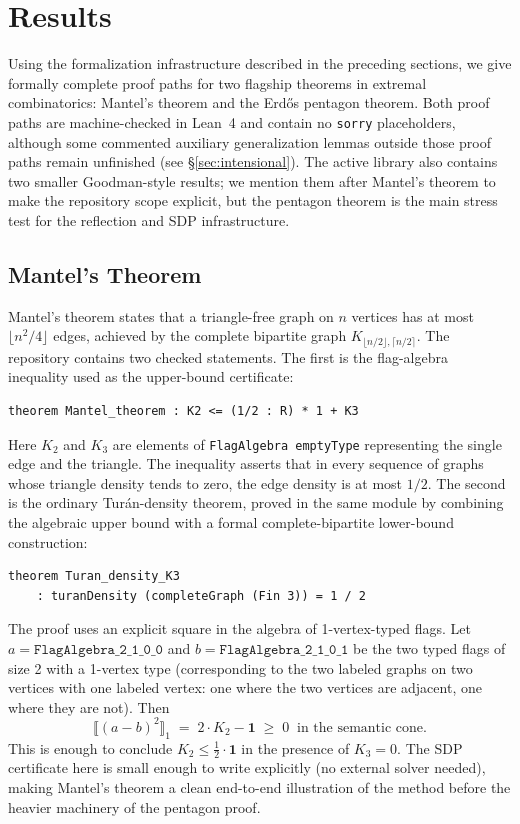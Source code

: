 \documentclass{article}
\newcommand{\lean}[1]{\texttt{#1}}
\begin{document}
\section{Results}
\label{sec:results}

Using the formalization infrastructure described in the preceding sections,
we give formally complete proof paths for two flagship theorems in extremal
combinatorics: Mantel's theorem and the Erd\H{o}s pentagon theorem.  Both
proof paths are machine-checked in Lean~4 and contain no \lean{sorry}
placeholders, although some commented auxiliary generalization lemmas outside
those proof paths remain unfinished (see \S\ref{sec:intensional}).  The active
library also contains two smaller Goodman-style results; we mention them after
Mantel's theorem to make the repository scope explicit, but the pentagon theorem
is the main stress test for the reflection and SDP infrastructure.

\subsection{Mantel's Theorem}

Mantel's theorem states that a triangle-free graph on $n$ vertices has at
most $\lfloor n^2/4 \rfloor$ edges, achieved by the complete bipartite graph
$K_{\lfloor n/2\rfloor, \lceil n/2\rceil}$.  The repository contains two
checked statements.  The first is the flag-algebra inequality used as the
upper-bound certificate:

\begin{lstlisting}
theorem Mantel_theorem : K2 <= (1/2 : R) * 1 + K3
\end{lstlisting}

Here $K_2$ and $K_3$ are elements of \lean{FlagAlgebra emptyType} representing the
single edge and the triangle.  The inequality asserts that in every sequence
of graphs whose triangle density tends to zero, the edge density is at most
$1/2$.  The second is the ordinary Turán-density theorem, proved in the same
module by combining the algebraic upper bound with a formal complete-bipartite
lower-bound construction:
\begin{lstlisting}
theorem Turan_density_K3
    : turanDensity (completeGraph (Fin 3)) = 1 / 2
\end{lstlisting}

The proof uses an explicit square in the algebra of 1-vertex-typed flags.
Let $a = \lean{FlagAlgebra\_2\_1\_0\_0}$ and $b = \lean{FlagAlgebra\_2\_1\_0\_1}$
be the two typed flags of size 2 with a 1-vertex type (corresponding to
the two labeled graphs on two vertices with one labeled vertex: one where the
two vertices are adjacent, one where they are not).
Then
\[
  \bigl\llbracket (a - b)^2 \bigr\rrbracket_1
  \;=\;
  2 \cdot K_2 - \mathbf{1}
  \;\geq\; 0
  \;\;\text{in the semantic cone.}
\]
This is enough to conclude $K_2 \leq \frac{1}{2} \cdot \mathbf{1}$ in the
presence of $K_3 = 0$.  The SDP certificate here is small enough to write
explicitly (no external solver needed), making Mantel's theorem a clean
end-to-end illustration of the method before the heavier machinery of the
pentagon proof.
\end{document}
